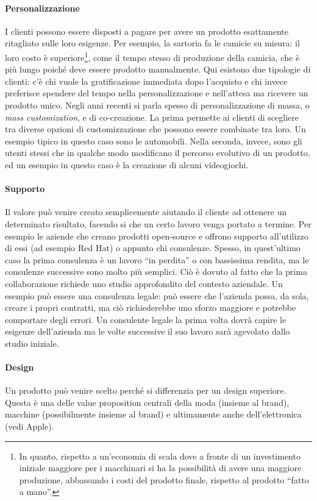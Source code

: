 \paragraph*{Personalizzazione} I clienti possono essere disposti a pagare per
avere un prodotto esattamente ritagliato sulle loro esigenze. Per esempio, la
sartoria fa le camicie su misura: il loro costo è superiore\footnote{In quanto,
rispetto a un'economia di scala dove a fronte di un investimento iniziale
maggiore per i macchinari si ha la possibilità di avere una maggiore
produzione, abbassando i costi del prodotto finale, rispetto al prodotto
``fatto a mano''.}, come il tempo stesso di produzione della camicia, che
è più lungo poiché deve essere prodotto manualmente. Qui esistono due tipologie
di clienti: c'è chi vuole la gratificazione immediata dopo l'acquisto e chi
invece preferisce spendere del tempo nella personalizzazione e nell'attesa ma
ricevere un prodotto unico.
Negli anni recenti si parla spesso di personalizzazione di massa, o
\textit{mass customization}, e di co-creazione. La prima permette ai clienti di
scegliere tra diverse opzioni di customizzazione che possono essere combinate
tra loro. Un esempio tipico in questo caso sono le automobili. Nella seconda,
invece, sono gli utenti stessi che in qualche modo modificano il percorso
evolutivo di un prodotto, ed un esempio in questo caso è la creazione di alcuni
videogiochi.

\paragraph*{Supporto} Il valore può venire creato semplicemente aiutando il
cliente ad ottenere un determinato risultato, facendo si che un certo lavoro
venga portato a termine. Per esempio le aziende che creano prodotti
open-source e offrono supporto all'utilizzo di essi (ad esempio Red Hat) o
appunto chi consulenze. Spesso, in quest'ultimo caso la
prima consulenza è un lavoro ``in perdita'' o con bassissima rendita, ma le
consulenze successive sono molto più semplici. Ciò è dovuto al fatto che la
prima collaborazione richiede uno studio approfondito del contesto aziendale.
Un esempio può essere una consulenza legale: può essere che l'azienda possa, da
sola, creare i propri contratti, ma ciò richiederebbe uno sforzo maggiore e
potrebbe comportare degli errori. Un consulente legale la prima volta dovrà
capire le esigenze dell'azienda ma le volte successive il suo lavoro sarà
agevolato dallo studio iniziale.

\paragraph*{Design} Un prodotto può venire scelto perché si differenzia per un
design superiore. Questa è una delle value proposition centrali della moda
(insieme al brand), macchine (possibilmente insieme al brand) e ultimamente
anche dell'elettronica (vedi Apple).

